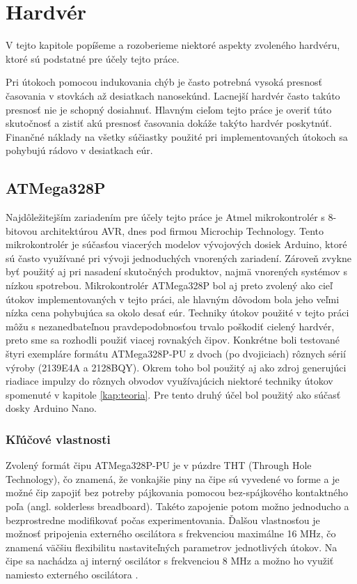 \chapter{Hardvér}

\label{kap:hardver}

V tejto kapitole popíšeme a rozoberieme niektoré aspekty zvoleného hardvéru, ktoré sú podstatné pre účely tejto práce.

Pri útokoch pomocou indukovania chýb je často potrebná vysoká presnosť časovania v stovkách až desiatkach nanosekúnd. Lacnejší hardvér často takúto presnosť nie je schopný dosiahnuť. Hlavným cieľom tejto práce je overiť túto skutočnosť a zistiť akú presnosť časovania dokáže takýto hardvér poskytnúť. Finančné náklady na všetky súčiastky použité pri implementovaných útokoch sa pohybujú rádovo v desiatkach eúr.

\section{ATMega328P}
Najdôležitejším zariadením pre účely tejto práce je Atmel mikrokontrolér s 8-bitovou architektúrou AVR, dnes pod firmou Microchip Technology. Tento mikrokontrolér je súčasťou viacerých modelov vývojových dosiek Arduino, ktoré sú často využívané pri vývoji jednoduchých vnorených zariadení. Zároveň zvykne byť použitý aj pri nasadení skutočných produktov, najmä vnorených systémov s nízkou spotrebou. Mikrokontrolér ATMega328P bol aj preto zvolený ako cieľ útokov implementovaných v tejto práci, ale hlavným dôvodom bola jeho veľmi nízka cena pohybujúca sa okolo desať eúr. Techniky útokov použité v tejto práci môžu s nezanedbateľnou pravdepodobnosťou trvalo poškodiť cielený hardvér, preto sme sa rozhodli použiť viacej rovnakých čipov. Konkrétne boli testované štyri exempláre formátu ATMega328P-PU z dvoch (po dvojiciach) rôznych sérií výroby (2139E4A a 2128BQY). Okrem toho bol použitý aj ako zdroj generujúci riadiace impulzy do rôznych obvodov využívajúcich niektoré techniky útokov spomenuté v kapitole \ref{kap:teoria}. Pre tento druhý účel bol použitý ako súčasť dosky Arduino Nano.

\subsection{Kľúčové vlastnosti}
Zvolený formát čipu ATMega328P-PU je v púzdre THT (Through Hole Technology), čo znamená, že vonkajšie piny na čipe sú vyvedené vo forme  a je možné čip zapojiť bez potreby pájkovania pomocou bez-spájkového kontaktného poľa (angl. solderless breadboard). Takéto zapojenie potom možno jednoducho a bezprostredne modifikovať počas experimentovania. Ďalšou vlastnosťou je možnosť pripojenia externého oscilátora s frekvenciou maximálne 16 MHz, čo znamená väčšiu flexibilitu nastaviteľných parametrov jednotlivých útokov. Na čipe sa nachádza aj interný oscilátor s frekvenciou 8 MHz a možno ho využiť namiesto externého oscilátora \cite{atmegaData}.

